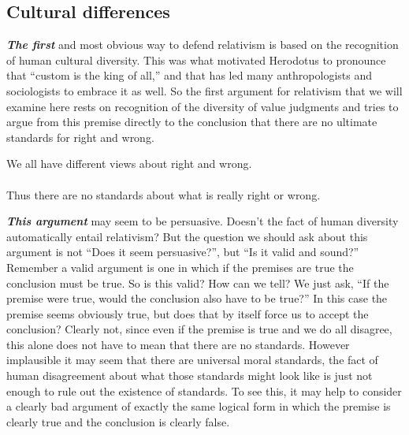 \documentclass[12pt, openany]{book}
\begin{document}
\hypertarget{cultural-differences}{%
\subsection*{Cultural differences}\label{cultural-differences}}


\textbf{\emph{The first}} and most obvious way to defend relativism is based on the recognition of human cultural diversity. This was what motivated Herodotus to pronounce that ``custom is the king of all,'' and that has led many anthropologists and sociologists to embrace it as well. So the first argument for relativism that we will examine here rests on recognition of the diversity of value judgments and tries to argue from this premise directly to the conclusion that there are no ultimate standards for right and wrong.

\begin{center}

\begin{argument}

We all have different views about right and wrong.\\
~\\
Thus there are no standards about what is really right or wrong.

\end{argument}

\end{center}

\textbf{\emph{This argument}} may seem to be persuasive. Doesn't the fact of human diversity automatically entail relativism? But the question we should ask about this argument is not ``Does it seem persuasive?'', but ``Is it valid and sound?'' Remember a valid argument is one in which if the premises are true the conclusion must be true. So is this valid? How can we tell? We just ask, ``If the premise were true, would the conclusion also have to be true?'' In this case the premise seems obviously true, but does that by itself force us to accept the conclusion? Clearly not, since even if the premise is true and we do all disagree, this alone does not have to mean that there are no standards. However implausible it may seem that there are universal moral standards, the fact of human disagreement about what those standards might look like is just not enough to rule out the existence of standards. To see this, it may help to consider a clearly bad argument of exactly the same logical form in which the premise is clearly true and the conclusion is clearly false.
\end{document}
